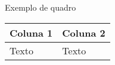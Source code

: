 \begin{quadro}[H]

	\begin{center}
	\caption{Exemplo de quadro
	\label{qua:exemplo}}
		\begin{tabular}{|p{5cm}|p{5cm}|}
			\hline
			\textbf{Coluna 1} & \textbf{Coluna 2}\\
			\hline
			Texto & Texto \\
			\hline
		\end{tabular}
	\end{center}
	\vspace*{-0,8cm}

	
\end{quadro}